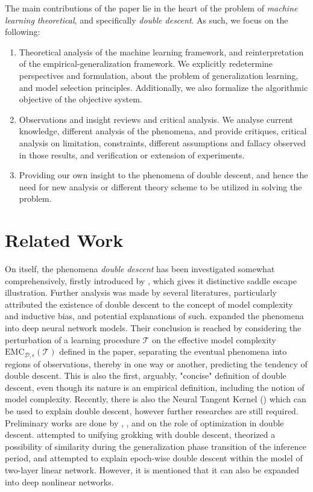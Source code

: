 \documentclass[10pt]{article} %
\begin{document}
The main contributions of the paper lie in the heart of the problem of \textit{machine learning theoretical}, and specifically \textit{double descent}. As such, we focus on the following:
\begin{enumerate}
    \item Theoretical analysis of the machine learning framework, and reinterpretation of the empirical-generalization framework. We explicitly redetermine perspectives and formulation, about the problem of generalization learning, and model selection principles. Additionally, we also formalize the algorithmic objective of the objective system. 
    \item Observations and insight reviews and critical analysis. We analyse current knowledge, different analysis of the phenomena, and provide critiques, critical analysis on limitation, constraints, different assumptions and fallacy observed in those results, and verification or extension of experiments. 
    \item Providing our own insight to the phenomena of double descent, and hence the need for new analysis or different theory scheme to be utilized in solving the problem. 
\end{enumerate}

\section{Related Work}

On itself, the phenomena \textit{double descent} has been investigated somewhat comprehensively, firstly introduced by \cite{belkin_reconciling_2019}, which gives it distinctive saddle escape illustration. Further analysis was made by several literatures, particularly attributed the existence of double descent to the concept of model complexity and inductive bias, and potential explanations of such. \cite{nakkiran_deep_2019} expanded the phenomena into deep neural network models. Their conclusion is reached by considering the perturbation of a learning procedure $\mathcal{T}$ on the effective model complexity $\mathrm{EMC}_{\mathcal{D},\epsilon}(\mathcal{T})$ defined in the paper, separating the eventual phenomena into regions of observations, thereby in one way or another, predicting the tendency of double descent. This is also the first, arguably, "concise" definition of double descent, even though its nature is an empirical definition, including the notion of model complexity. Recently, there is also the Neural Tangent Kernel (\cite{Jacot:2018:NTK}) which can be used to explain double descent, however further researches are still required. Preliminary works are done by \cite{lafon_understanding_2024}, \cite{schaeffer_double_2023}, and \cite{liu2023understandingroleoptimizationdouble} on the role of optimization in double descent. \cite{davies_unifying_2023} attempted to unifying grokking with double descent, theorized a possibility of similarity during the generalization phase transition of the inference period, and \cite{olmin2024understandingepochwisedoubledescent} attempted to explain epoch-wise double descent within the model of two-layer linear network. However, it is mentioned that it can also be expanded into deep nonlinear networks. 
\end{document}
